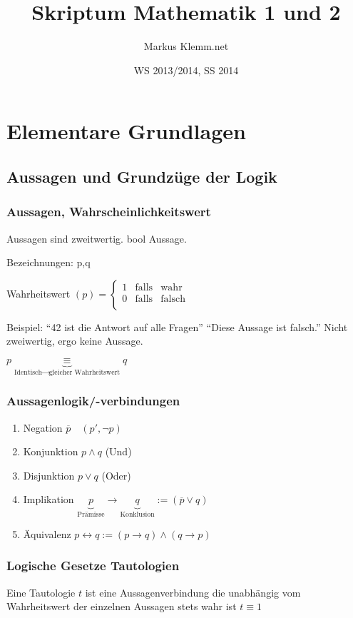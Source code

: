 \documentclass[a4paper]{scrartcl}
\title{Skriptum Mathematik 1 und 2}
\date{WS 2013/2014, SS 2014}
\author{Markus Klemm.net}
\begin{document}
\maketitle

\tableofcontents

\section{Elementare Grundlagen}
\subsection{Aussagen und Grundzüge der Logik}
\subsubsection{Aussagen, Wahrscheinlichkeitswert}
Aussagen sind zweitwertig. bool Aussage.

Bezeichnungen: p,q

Wahrheitswert $(p) =\left\{ \begin{array}{rcl}
         1
         & \mbox{falls}
         & \text{wahr} \\ 
         0  
         & \mbox{falls} 
         & \text{falsch} \\
                \end{array}\right.
                $

Beispiel: 
"`42 ist die Antwort auf alle Fragen"'
"`Diese Aussage ist falsch."' Nicht zweiwertig, ergo keine Aussage.

$p \underbrace{\equiv}_{\text{Identisch} \rightarrow \text{gleicher Wahrheitswert}} q$
\subsubsection{Aussagenlogik/-verbindungen}
\begin{enumerate}
\item Negation $\overline{p} \quad (p' , \neg p )$
\item Konjunktion $p \wedge q$ (Und)
\item Disjunktion $p \vee q$ (Oder)
\item Implikation $\underbrace{p}_{\text{Prämisse}} \rightarrow \underbrace{q}_{\text{Konklusion}} := (\overline{p} \vee q)$
\item Äquivalenz $p \leftrightarrow q := (p\rightarrow q) \wedge (q \rightarrow p)$
\end{enumerate}
\subsubsection{Logische Gesetze Tautologien}
Eine Tautologie $t$ ist eine Aussagenverbindung die unabhängig vom Wahrheitswert der einzelnen Aussagen stets wahr ist $t \equiv 1$
\end{document}
